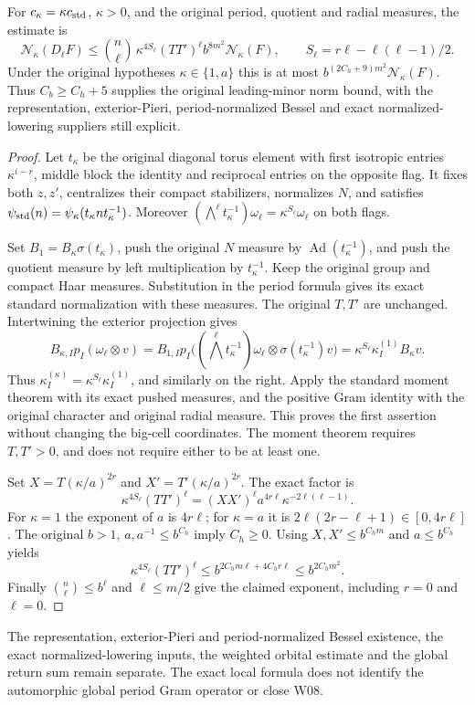 \begin{proposition}\label{jacquet-original-scale-transport}
For $c_\kappa=\kappa c_{\rm std}$, $\kappa>0$, and the original
period, quotient and radial measures, the estimate is
\[
 \mathcal N_\kappa(D_\ell F)
 \le\binom n\ell\,\kappa^{4S_\ell}(TT')^\ell
                   b^{8m^2}\mathcal N_\kappa(F),
 \qquad S_\ell=r\ell-\ell(\ell-1)/2.
\]
Under the original hypotheses $\kappa\in\{1,a\}$ this is at most
$b^{(2C_h+9)m^2}\mathcal N_\kappa(F)$.
Thus $C_b\ge C_h+5$ supplies the original leading-minor
norm bound, with the representation, exterior-Pieri, period-normalized
Bessel and exact normalized-lowering suppliers still explicit.
\end{proposition}
\begin{proof}
Let $t_\kappa$ be the original diagonal torus element with
first isotropic entries $\kappa^{i-r}$, middle block the identity
and reciprocal entries on the opposite flag.
It fixes both $z,z'$, centralizes their compact stabilizers,
normalizes $N$, and satisfies
$\psi_{\rm std}(n)=\psi_\kappa(t_\kappa n t_\kappa^{-1})$.
Moreover
$(\bigwedge^\ell t_\kappa^{-1})\omega_\ell
 =\kappa^{S_\ell}\omega_\ell$ on both flags.

Set $B_1=B_\kappa\sigma(t_\kappa)$, push the original $N$
measure by $\operatorname{Ad}(t_\kappa^{-1})$, and push the
quotient measure by left multiplication by $t_\kappa^{-1}$.
Keep the original group and compact Haar measures.
Substitution in the period formula gives its exact standard
normalization with these measures. The original $T,T'$ are
unchanged. Intertwining the exterior projection gives
\[
 B_{\kappa,I}p_I(\omega_\ell\otimes v)
 =B_{1,I}p_I\bigl((\bigwedge^\ell t_\kappa^{-1})\omega_\ell
                          \otimes\sigma(t_\kappa^{-1})v\bigr)
 =\kappa^{S_\ell}\kappa_I^{(1)}B_\kappa v .
\]
Thus $\kappa_I^{(\kappa)}=\kappa^{S_\ell}\kappa_I^{(1)}$,
and similarly on the right. Apply the standard moment theorem
with its exact pushed measures, and the positive Gram identity
with the original character and original radial measure.
This proves the first assertion without changing the big-cell
coordinates. The moment theorem requires $T,T'>0$, and does
not require either to be at least one.

Set $X=T(\kappa/a)^{2r}$ and $X'=T'(\kappa/a)^{2r}$.
The exact factor is
\[
 \kappa^{4S_\ell}(TT')^\ell
 =(XX')^\ell a^{4r\ell}\kappa^{-2\ell(\ell-1)}.
\]
For $\kappa=1$ the exponent of $a$ is $4r\ell$;
for $\kappa=a$ it is $2\ell(2r-\ell+1)\in[0,4r\ell]$.
The original $b>1$, $a,a^{-1}\le b^{C_h}$ imply $C_h\ge0$.
Using $X,X'\le b^{C_hm}$ and $a\le b^{C_h}$ yields
\[
 \kappa^{4S_\ell}(TT')^\ell
 \le b^{2C_hm\ell+4C_hr\ell}\le b^{2C_hm^2}.
\]
Finally $\binom n\ell\le b^\ell$ and $\ell\le m/2$ give the
claimed exponent, including $r=0$ and $\ell=0$.
\end{proof}

The representation, exterior-Pieri and period-normalized Bessel
existence, the exact normalized-lowering inputs, the weighted
orbital estimate and the global return sum remain separate.
The exact local formula does not identify the automorphic
global period Gram operator or close W08.

